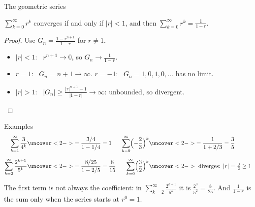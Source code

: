 \documentclass[10pt]{wosm-slides}
\begin{document}
\begin{frame}{The geometric series}
  \begin{theorem}
    $\sum_{k=0}^{\infty} r^k$ converges if and only if $|r| < 1$, and then
    $\sum_{k=0}^{\infty} r^k = \frac{1}{1-r}$.
  \end{theorem}
  \pause
  \begin{proof}
    Use $G_n = \frac{1 - r^{n+1}}{1-r}$ for $r \ne 1$.
    \begin{itemize}
      \item $|r| < 1$: \ $r^{n+1} \to 0$, so $G_n \to \frac{1}{1-r}$.
      \item $r = 1$: \ $G_n = n + 1 \to \infty$. \quad
        $r = -1$: \ $G_n = 1, 0, 1, 0, \dots$ has no limit.
      \item $|r| > 1$: \ $|G_n| \ge \frac{|r|^{n+1} - 1}{|1 - r|} \to \infty$:
        unbounded, so divergent. \qedhere
    \end{itemize}
  \end{proof}
\end{frame}


\begin{frame}{Examples}
  \begin{align*}
    \sum_{k=1}^\infty \frac{3}{4^k}
      &\uncover<2->{= \frac{3/4}{1 - 1/4} = 1}
    & \sum_{k=0}^\infty \Bigl(-\frac23\Bigr)^k
      &\uncover<2->{= \frac{1}{1 + 2/3} = \frac35} \\[0.6em]
    \sum_{k=2}^\infty \frac{2^{k+1}}{5^k}
      &\uncover<2->{= \frac{8/25}{1 - 2/5} = \frac{8}{15}}
    & \sum_{k=0}^\infty \Bigl(\frac32\Bigr)^k
      &\uncover<2->{\ \text{diverges: } |r| = \tfrac32 \ge 1}
  \end{align*}
  \begin{warning}
    The first term is not always the coefficient: in $\sum_{k=2}^\infty \frac{2^{k+1}}{5^k}$
    it is $\frac{2^3}{5^2} = \frac{8}{25}$.
    And $\frac{1}{1-r}$ is the sum only when the series starts at $r^0 = 1$.
  \end{warning}
\end{frame}
\end{document}
